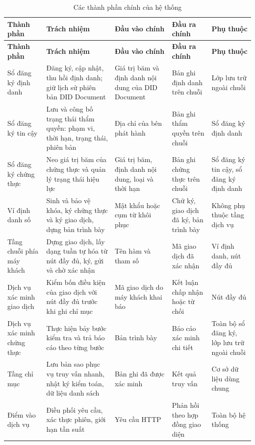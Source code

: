 \begin{longtable}{|p{2.8cm}|p{4.3cm}|p{2.1cm}|p{2.4cm}|p{2.4cm}|}
\caption{Các thành phần chính của hệ thống}
\label{tab:system-components} \\

\hline
\textbf{Thành phần} & \textbf{Trách nhiệm} & \textbf{Đầu vào chính} & \textbf{Đầu ra chính} & \textbf{Phụ thuộc} \\
\hline
\endfirsthead

\hline
\textbf{Thành phần} & \textbf{Trách nhiệm} & \textbf{Đầu vào chính} & \textbf{Đầu ra chính} & \textbf{Phụ thuộc} \\
\hline
\endhead

\hline
\endfoot

\hline
\endlastfoot

Sổ đăng ký định danh
& Đăng ký, cập nhật, thu hồi định danh; giữ lịch sử phiên bản DID Document
& Giá trị băm và định danh nội dung của DID Document
& Bản ghi định danh trên chuỗi
& Lớp lưu trữ ngoài chuỗi
\\ \hline

Sổ đăng ký tin cậy
& Lưu và công bố trạng thái thẩm quyền: phạm vi, thời hạn, trạng thái, phiên bản
& Địa chỉ của bên phát hành
& Bản ghi thẩm quyền trên chuỗi
& Sổ đăng ký định danh
\\ \hline

Sổ đăng ký chứng thực
& Neo giá trị băm của chứng thực và quản lý trạng thái hiệu lực
& Giá trị băm, định danh nội dung, loại và thời hạn
& Bản ghi chứng thực trên chuỗi
& Sổ đăng ký tin cậy, sổ đăng ký định danh
\\ \hline

Ví định danh số
& Sinh và bảo vệ khóa, ký chứng thực và ký giao dịch, dựng bản trình bày
& Mật khẩu hoặc cụm từ khôi phục
& Chữ ký, giao dịch đã ký, bản trình bày
& Không phụ thuộc tầng dịch vụ
\\ \hline

Tầng chuỗi phía máy khách
& Dựng giao dịch, lấy dạng tuần tự hóa từ nút đầy đủ, ký, gửi và chờ xác nhận
& Tên hàm và tham số
& Mã giao dịch đã xác nhận
& Ví định danh, nút đầy đủ
\\ \hline

Dịch vụ xác minh giao dịch
& Kiểm bốn điều kiện của giao dịch với nút đầy đủ trước khi ghi chỉ mục
& Mã giao dịch do máy khách khai báo
& Kết luận chấp nhận hoặc từ chối
& Nút đầy đủ
\\ \hline

Dịch vụ xác minh chứng thực
& Thực hiện bảy bước kiểm tra và trả báo cáo theo từng bước
& Bản trình bày
& Báo cáo xác minh chi tiết
& Toàn bộ sổ đăng ký, lớp lưu trữ ngoài chuỗi
\\ \hline

Tầng chỉ mục
& Lưu bản sao phục vụ truy vấn nhanh, nhật ký kiểm toán, dữ liệu danh sách
& Bản ghi đã được xác minh
& Kết quả truy vấn
& Cơ sở dữ liệu dùng chung
\\ \hline

Điểm vào dịch vụ
& Điều phối yêu cầu, xác thực phiên, giới hạn tần suất
& Yêu cầu HTTP
& Phản hồi theo hợp đồng giao diện
& Toàn bộ hệ thống
\\ \hline

\end{longtable}
